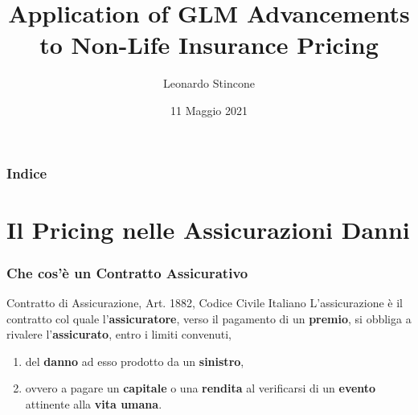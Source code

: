 \documentclass[pdf, aspectratio=169]{beamer}\usepackage[]{graphicx}\usepackage[]{color}
\title{Application of GLM Advancements \\ to Non-Life Insurance Pricing}
\author{Leonardo Stincone}
\date{11 Maggio 2021}
\institute[units]{Università degli Studi di Trieste}
\theoremstyle{definition}
\begin{document}
\begin{frame}
\titlepage
\end{frame}



\begin{frame}
\frametitle{Indice}

\tableofcontents


\end{frame}


\section{Il Pricing nelle Assicurazioni Danni}


\begin{frame}
\frametitle{Che cos'è un Contratto Assicurativo}

\begin{block}{Contratto di Assicurazione, Art. 1882, Codice Civile Italiano}
  L'assicurazione è il contratto col quale l'{\bfseries assicuratore}, verso il pagamento di un {\bfseries premio}, si obbliga a rivalere l'{\bfseries assicurato}, entro i limiti convenuti,
  
  \begin{enumerate}
    \item del {\bfseries danno} ad esso prodotto da un {\bfseries sinistro},
    \item ovvero a pagare un {\bfseries capitale} o una {\bfseries rendita} al verificarsi di un {\bfseries evento} attinente alla {\bfseries vita umana}.
  \end{enumerate}
\end{block}

\end{frame}
\end{document}
